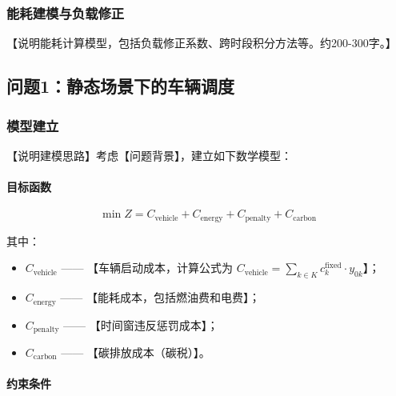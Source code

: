 \documentclass[12pt,letterpaper]{ctexart}
\numberwithin{equation}{section}
\numberwithin{figure}{section}
\numberwithin{table}{section}
\begin{document}
\subsubsection{能耗建模与负载修正}
【说明能耗计算模型，包括负载修正系数、跨时段积分方法等。约200-300字。】

\subsection{问题1：静态场景下的车辆调度}

\subsubsection{模型建立}

【说明建模思路】考虑【问题背景】，建立如下数学模型：

\paragraph{目标函数}

\begin{equation}\label{eq:obj}
\min Z = C_{\text{vehicle}} + C_{\text{energy}} + C_{\text{penalty}} + C_{\text{carbon}}
\end{equation}

其中：
\begin{itemize}
    \item $C_{\text{vehicle}}$ —— 【车辆启动成本，计算公式为 $C_{\text{vehicle}} = \sum_{k \in K} c_k^{\text{fixed}} \cdot y_{0k}$】；
    \item $C_{\text{energy}}$ —— 【能耗成本，包括燃油费和电费】；
    \item $C_{\text{penalty}}$ —— 【时间窗违反惩罚成本】；
    \item $C_{\text{carbon}}$ —— 【碳排放成本（碳税）】。
\end{itemize}

\paragraph{约束条件}
\end{document}
